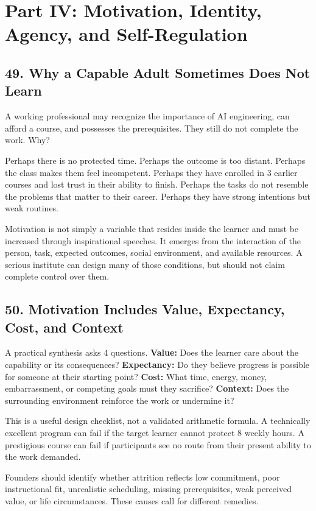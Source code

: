 \section*{Part IV: Motivation, Identity, Agency, and Self-Regulation}

\subsection*{49. Why a Capable Adult Sometimes Does Not Learn}

A working professional may recognize the importance of AI engineering, can afford a course, and possesses the prerequisites. They still do not complete the work. Why?

Perhaps there is no protected time. Perhaps the outcome is too distant. Perhaps the class makes them feel incompetent. Perhaps they have enrolled in 3 earlier courses and lost trust in their ability to finish. Perhaps the tasks do not resemble the problems that matter to their career. Perhaps they have strong intentions but weak routines.

Motivation is not simply a variable that resides inside the learner and must be increased through inspirational speeches. It emerges from the interaction of the person, task, expected outcomes, social environment, and available resources. A serious institute can design many of those conditions, but should not claim complete control over them.

\subsection*{50. Motivation Includes Value, Expectancy, Cost, and Context}

A practical synthesis asks 4 questions. \textbf{Value:} Does the learner care about the capability or its consequences? \textbf{Expectancy:} Do they believe progress is possible for someone at their starting point? \textbf{Cost:} What time, energy, money, embarrassment, or competing goals must they sacrifice? \textbf{Context:} Does the surrounding environment reinforce the work or undermine it?

This is a useful design checklist, not a validated arithmetic formula. A technically excellent program can fail if the target learner cannot protect 8 weekly hours. A prestigious course can fail if participants see no route from their present ability to the work demanded.

Founders should identify whether attrition reflects low commitment, poor instructional fit, unrealistic scheduling, missing prerequisites, weak perceived value, or life circumstances. These causes call for different remedies.

